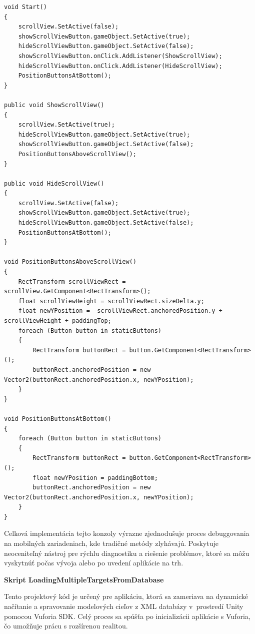 \lstset{style=Csharp}
\begin{lstlisting}[caption={UIScrollviewController Class - UI manažér pre zobrazenie a skrytie posúvateľnej oblasti}, label=UiScrollViewController]
void Start()
{
    scrollView.SetActive(false);
    showScrollViewButton.gameObject.SetActive(true);
    hideScrollViewButton.gameObject.SetActive(false);
    showScrollViewButton.onClick.AddListener(ShowScrollView);
    hideScrollViewButton.onClick.AddListener(HideScrollView);
    PositionButtonsAtBottom();
}

public void ShowScrollView()
{
    scrollView.SetActive(true);
    hideScrollViewButton.gameObject.SetActive(true);
    showScrollViewButton.gameObject.SetActive(false);
    PositionButtonsAboveScrollView();
}

public void HideScrollView()
{
    scrollView.SetActive(false);
    showScrollViewButton.gameObject.SetActive(true);
    hideScrollViewButton.gameObject.SetActive(false);
    PositionButtonsAtBottom();
}

void PositionButtonsAboveScrollView()
{
    RectTransform scrollViewRect = scrollView.GetComponent<RectTransform>();
    float scrollViewHeight = scrollViewRect.sizeDelta.y;
    float newYPosition = -scrollViewRect.anchoredPosition.y + scrollViewHeight + paddingTop;
    foreach (Button button in staticButtons)
    {
        RectTransform buttonRect = button.GetComponent<RectTransform>();
        buttonRect.anchoredPosition = new Vector2(buttonRect.anchoredPosition.x, newYPosition);
    }
}

void PositionButtonsAtBottom()
{
    foreach (Button button in staticButtons)
    {
        RectTransform buttonRect = button.GetComponent<RectTransform>();
        float newYPosition = paddingBottom;
        buttonRect.anchoredPosition = new Vector2(buttonRect.anchoredPosition.x, newYPosition);
    }
}
\end{lstlisting} 

Celková implementácia tejto konzoly výrazne zjednodušuje proces debuggovania na mobilných zariadeniach, kde tradičné metódy zlyhávajú. Poskytuje neoceniteľný nástroj pre rýchlu diagnostiku a riešenie problémov, ktoré sa môžu vyskytnúť počas vývoja alebo po uvedení aplikácie na trh.

{\large\textbf{Skript LoadingMultipleTargetsFromDatabase}}

Tento projektový kód je určený pre aplikáciu, ktorá sa zameriava na dynamické načítanie a spravovanie modelových cieľov z XML databázy v~prostredí Unity pomocou Vuforia SDK. Celý proces sa spúšťa po inicializácii aplikácie s Vuforia, čo umožňuje prácu s rozšírenou realitou.

